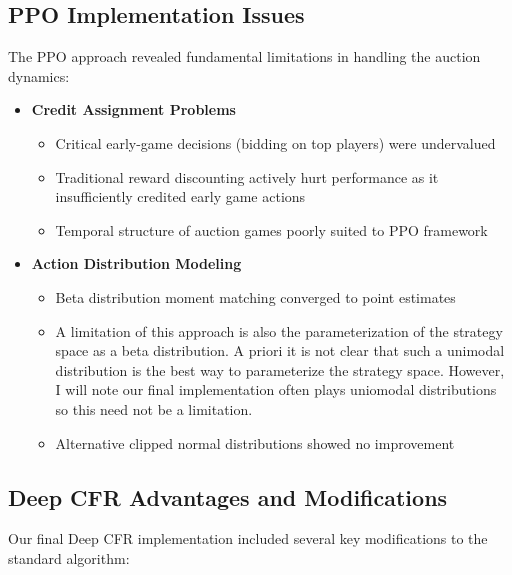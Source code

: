 \documentclass[11pt]{article}
\begin{document}
\subsection{PPO Implementation Issues}
The PPO approach revealed fundamental limitations in handling the auction dynamics:

\begin{itemize}
    \item \textbf{Credit Assignment Problems}
    \begin{itemize}
        \item Critical early-game decisions (bidding on top players) were undervalued
        \item Traditional reward discounting actively hurt performance as it insufficiently credited early game actions
        \item Temporal structure of auction games poorly suited to PPO framework
    \end{itemize}
    
    \item \textbf{Action Distribution Modeling}
    \begin{itemize}
        \item Beta distribution moment matching converged to point estimates
        \item A limitation of this approach is also the parameterization of the strategy space as a beta distribution. A priori it is not clear that such a unimodal distribution is the best way to parameterize the strategy space. However, I will note our final implementation often plays uniomodal distributions so this need not be a limitation.
        \item Alternative clipped normal distributions showed no improvement
    \end{itemize}
\end{itemize}

\subsection{Deep CFR Advantages and Modifications}
Our final Deep CFR implementation included several key modifications to the standard algorithm:
\end{document}
